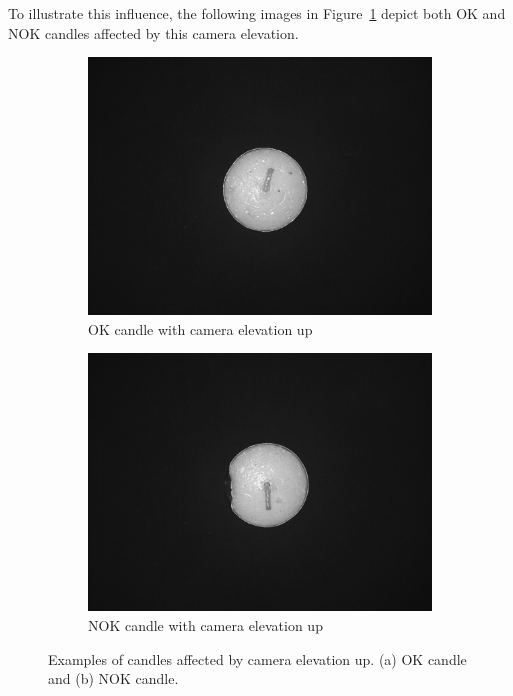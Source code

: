\documentclass[12pt,DIV14,BCOR12mm,a4paper,footinclude=false,headinclude,parskip=half-,twoside,openright,cleardoublepage=empty,toc=index,bibliography=totoc,listof=totoc]{scrreprt}
\numberwithin{equation}{chapter}
\begin{document}
\begin{enumerate}
	To illustrate this influence, the following images in Figure~\ref{fig:camera_elevation_up} depict both OK and NOK candles affected by this camera elevation.

	\begin{figure}
		\centering
		\begin{subfigure}[b]{0.45\textwidth}
			\centering
			\includegraphics[scale=0.15]{../media/Candles-influence-camera-up-OK.png}
			\caption{OK candle with camera elevation up}
		\end{subfigure}
		\hfill
		\begin{subfigure}[b]{0.45\textwidth}
			\centering
			\includegraphics[scale=0.15]{../media/Candles-influence-camera-up-NOK.png}
			\caption{NOK candle with camera elevation up}
		\end{subfigure}
		\caption{Examples of candles affected by camera elevation up. (a) OK candle and (b) NOK candle.}
		\label{fig:camera_elevation_up}
	\end{figure}
\end{enumerate}
\end{document}
